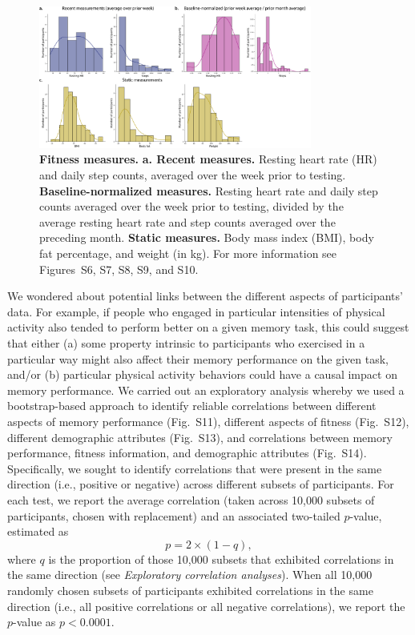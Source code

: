 \documentclass[10pt]{article}
\newcommand{\fitDists}{S6}
\newcommand{\fitDistgridImmediate}{S7}
\newcommand{\fitScatterImmediate}{S8}
\newcommand{\fitDistgridDelayed}{S9}
\newcommand{\fitScatterDelayed}{S10}
\newcommand{\behBehCorr}{S11}
\newcommand{\fitFitCorr}{S12}
\newcommand{\demDemCorr}{S13}
\newcommand{\allCorr}{S14}
\begin{document}
\begin{figure}[tp]
\centering
\includegraphics[width=0.8\textwidth]{figs/fitness_distributions_summary}
\caption{\textbf{Fitness measures.}  \textbf{a. Recent measures.}
  Resting heart rate (HR) and daily step counts, averaged over the
  week prior to testing.  \textbf{Baseline-normalized measures.}
  Resting heart rate and daily step counts averaged over the week
  prior to testing, divided by the average resting heart rate and step
counts averaged over the preceding month.  \textbf{Static measures.}
Body mass index (BMI), body fat percentage, and weight (in kg).  For
more information see Figures~\fitDists, \fitDistgridImmediate,
\fitScatterImmediate, \fitDistgridDelayed, and \fitScatterDelayed.}
\label{fig:fitness_summary}
\end{figure}

We wondered about potential links between the different aspects of
participants' data.  For example, if people who engaged in particular intensities of physical activity also tended to perform better on a given memory task,
this could suggest that either (a) some property intrinsic to
participants who exercised in a particular way might also affect their
memory performance on the given task, and/or (b) particular physical activity
behaviors could have a causal impact on memory performance.  We
carried out an exploratory analysis whereby we used a bootstrap-based
approach to identify reliable correlations between different aspects
of memory performance (Fig.~\behBehCorr), different aspects of fitness
(Fig.~\fitFitCorr), different demographic attributes
(Fig.~\demDemCorr), and correlations between memory performance,
fitness information, and demographic attributes (Fig.~\allCorr).
Specifically, we sought to identify correlations that were present in
the same direction (i.e., positive or negative) across different
subsets of participants.  For each test, we report the average correlation (taken
across 10,000 subsets of participants, chosen with replacement) and
an associated two-tailed $p$-value, estimated as
\[
p = 2 \times (1 - q),
\]
where $q$ is the proportion of those
10,000 subsets that exhibited correlations in the same direction  (see
\textit{Exploratory correlation analyses}).  When all 10,000 randomly
chosen subsets of participants exhibited correlations in the same
direction (i.e., all positive correlations or all negative
correlations), we report the $p$-value as $p < 0.0001$.
\end{document}
